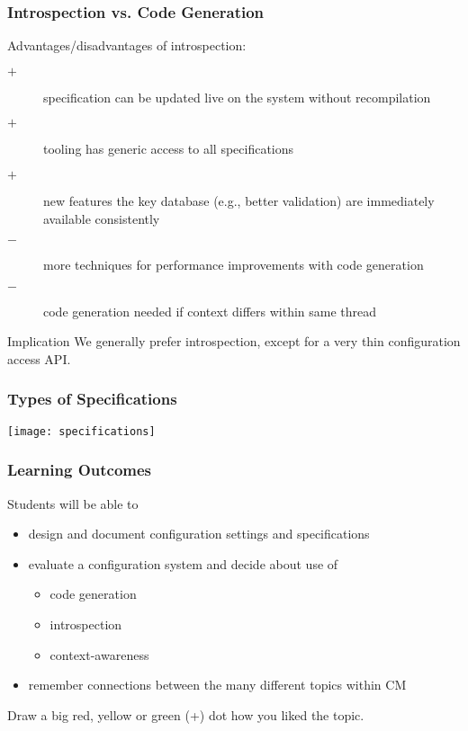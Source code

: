 \begin{frame}
	\frametitle{Introspection vs. Code Generation}

	Advantages/disadvantages of introspection:

	\pause

	\begin{description}
	\item[$+$] specification can be updated live on the system without recompilation
	\item[$+$] tooling has generic access to all specifications
 	\item[$+$] new features the key database (e.g., better validation) are immediately available consistently
	\item[$-$] more techniques for performance improvements with code generation
	\item[$-$] code generation needed if context differs within same thread
	\end{description}

	\vspace{0.5em}

	\begin{alertblock}{Implication}
	We generally prefer introspection, except for a very thin configuration access API.
	\end{alertblock}
\end{frame}

\begin{frame}
	\frametitle{Types of Specifications}
	\texttt{[image: specifications]}
\end{frame}


\begin{frame}
	\frametitle{Learning Outcomes}
	Students will be able to

	\begin{itemize}
	\item design and document configuration settings and specifications
	\item evaluate a configuration system and decide about use of
	\begin{itemize}
	\item code generation
	\item introspection
	\item context-awareness
	\end{itemize}
	\item remember connections between the many different topics within CM
	\end{itemize}

	\vspace{2cm}

	\begin{task}
	Draw a big red, yellow or green (+) dot how you liked the topic.
	\end{task}
\end{frame}


